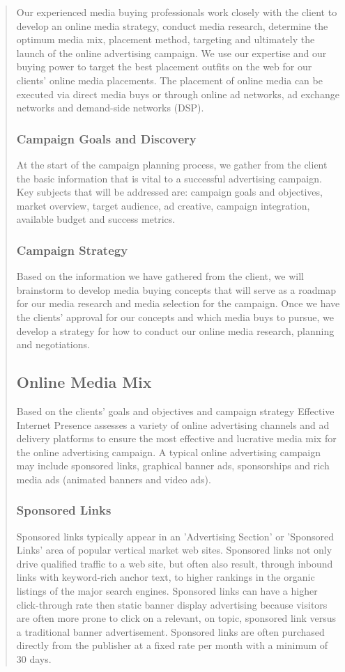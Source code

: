 \documentclass[35pt]{report}
\begin{document}
\begin{quote}
Our experienced media buying professionals work closely with the client to develop an online media strategy, conduct media research, determine the optimum media mix, placement method, targeting and ultimately the launch of the online advertising campaign. We use our expertise and our buying power to target the best placement outfits on the web for our clients' online media placements. The placement of online media can be executed via direct media buys or through online ad networks, ad exchange networks and demand-side networks (DSP).

			\subsubsection{Campaign Goals and Discovery}
At the start of the campaign planning process, we gather from the client the basic information that is vital to a successful advertising campaign. Key subjects that will be addressed are: campaign goals and objectives, market overview, target audience, ad creative, campaign integration, available budget and success metrics.

			\subsubsection{Campaign Strategy}
Based on the information we have gathered from the client, we will brainstorm to develop media buying concepts that will serve as a roadmap for our media research and media selection for the campaign. Once we have the clients' approval for our concepts and which media buys to pursue, we develop a strategy for how to conduct our online media research, planning and negotiations.

		\subsection{Online Media Mix}
Based on the clients' goals and objectives and campaign strategy Effective Internet Presence assesses a variety of online advertising channels and ad delivery platforms to ensure the most effective and lucrative media mix for the online advertising campaign. A typical online advertising campaign may include sponsored links, graphical banner ads, sponsorships and rich media ads (animated banners and video ads).

			\subsubsection{Sponsored Links}
Sponsored links typically appear in an 'Advertising Section' or 'Sponsored Links' area of popular vertical market web sites. Sponsored links not only drive qualified traffic to a web site, but often also result, through inbound links with keyword-rich anchor text, to higher rankings in the organic listings of the major search engines. Sponsored links can have a higher click-through rate then static banner display advertising because visitors are often more prone to click on a relevant, on topic, sponsored link versus a traditional banner advertisement. Sponsored links are often purchased directly from the publisher at a fixed rate per month with a minimum of 30 days.


\end{quote}
\end{document}

